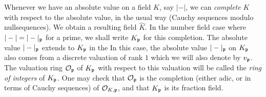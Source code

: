 Whenever we have an absolute value on a field $K$, say $|-|$, we can \emph{complete} $K$ with respect to the absolute value, in the usual way (Cauchy sequences modulo nullsequences).
We obtain a resulting field $\hat K$.
In the number field case where $|-| = |-|_{\mathfrak{p}}$ for a prime, we shall write $K_{\mathfrak{p}}$ for this completion.
The absolute value $|-|_{\mathfrak{p}}$ extends to $K_{\mathfrak{p}}$ in the 
In this case, the absolute value $|-|_{\mathfrak{p}}$ on $K_{\mathfrak{p}}$ also comes from a discrete valuation of rank $1$ which we will also denote by $v_{\mathfrak{p}}$.
The valuation ring $\mathcal{O}_{\mathfrak{p}}$ of $K_{\mathfrak{p}}$ with respect to this valuation will be called the \emph{ring of integers} of $K_{\mathfrak{p}}$.
One may check that $\mathcal{O}_{\mathfrak{p}}$ is the completion (either adic, or in terms of Cauchy sequences) of $\mathcal{O}_{K,\mathfrak{p}}$, and that $K_{\mathfrak{p}}$ is its fraction field.

